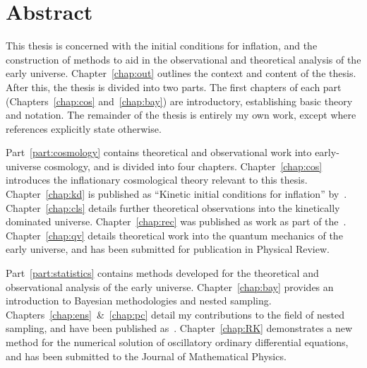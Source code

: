 \chapter*{Abstract}
\label{chap:abstract}

This thesis is concerned with the initial conditions for inflation, and the construction of methods to aid in the observational and theoretical analysis of the early universe.
Chapter~\ref{chap:out} outlines the context and content of the thesis. After this, the thesis is divided into two parts.
The first chapters of each part (Chapters~\ref{chap:cos} and~\ref{chap:bay}) are introductory, establishing basic theory and notation. The remainder of the thesis is entirely my own work, except where references explicitly state otherwise.

Part~\ref{part:cosmology} contains theoretical and observational work into early-universe cosmology, and is divided into four chapters. Chapter~\ref{chap:cos} introduces the inflationary cosmological theory relevant to this thesis. Chapter~\ref{chap:kd} is published as ``Kinetic initial conditions for inflation'' by~\cite{Handley+2014}. Chapter~\ref{chap:cls} details further theoretical observations into the kinetically dominated universe. Chapter~\ref{chap:rec} was published as work as part of the~\cite{planck2015-a24}. Chapter~\ref{chap:qv} details theoretical work into the quantum mechanics of the early universe, and has been submitted for publication in Physical Review.

Part~\ref{part:statistics} contains methods developed for the theoretical and observational analysis of the early universe. Chapter~\ref{chap:bay} provides an introduction to Bayesian methodologies and nested sampling.
Chapters~\ref{chap:ens}~\&~\ref{chap:pc} detail my contributions to the field of nested sampling, and have been published as~\cite{polychordletter,polychordpaper}.
Chapter~\ref{chap:RK} demonstrates a new method for the numerical solution of oscillatory ordinary differential equations, and has been submitted to the Journal of Mathematical Physics.


\cleardoublepage{}
